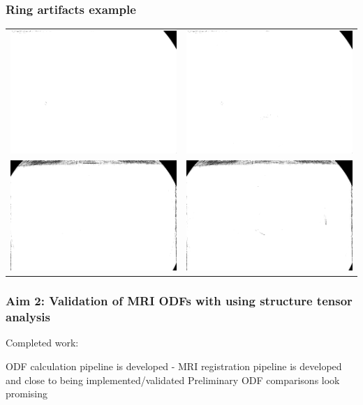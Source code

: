 \documentclass[presentation, 10pt]{beamer}
\begin{document}
\begin{frame}
  \frametitle{Ring artifacts example}
  \begin{center}
    \begin{tabular}[h]{c c}
      \includegraphics[width=0.45\linewidth]{figs/bad_rings} & \includegraphics[width=0.45\linewidth]{figs/bad_rings_fixed} \\
      \includegraphics[width=0.45\linewidth]{figs/med_rings}  & \includegraphics[width=0.45\linewidth]{figs/med_rings_fixed}
    \end{tabular}
  \end{center}

\end{frame}
\begin{frame}
  \frametitle{Aim 2: Validation of MRI ODFs with \bolduct using structure tensor
    analysis}
  Completed work:
  \begin{outline}
    \1 \uct ODF calculation pipeline is developed
    \1 \uct - MRI registration pipeline is developed and close to being implemented/validated
    \1 Preliminary ODF comparisons look promising
  \end{outline}
\end{frame}
\end{document}
